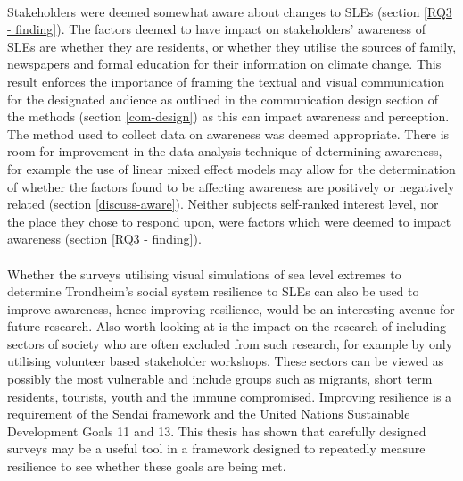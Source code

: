 \paragraph{}
Stakeholders were deemed somewhat aware about changes to SLEs (section \ref{RQ3 - finding}). The factors deemed to have impact on stakeholders' awareness of SLEs are whether they are residents, or whether they utilise the sources of family, newspapers and formal education for their information on climate change. This result enforces the importance of framing the textual and visual communication for the designated audience as outlined in the communication design section of the methods (section \ref{com-design}) as this can impact awareness and perception.  The method used to collect data on awareness was deemed appropriate. There is room for improvement in the data analysis technique of determining awareness, for example the use of linear mixed effect models may allow for the determination of whether the factors found to be affecting awareness are positively or negatively related (section \ref{discuss-aware}). Neither subjects self-ranked interest level, nor the place they chose to respond upon, were factors which were deemed to impact awareness (section \ref{RQ3 - finding}).
\paragraph{}



Whether the surveys utilising visual simulations of sea level extremes to determine Trondheim's social system resilience to SLEs can also be used to improve awareness, hence improving resilience, would be an interesting avenue for future research. Also worth looking at is the impact on the research of including sectors of society who are often excluded from such research, for example by only utilising volunteer based stakeholder workshops. These sectors can be viewed as possibly the most vulnerable and include groups such as migrants, short term residents, tourists, youth and the immune compromised. Improving resilience is a requirement of the Sendai framework and the United Nations Sustainable Development Goals 11 and 13. This thesis has shown that carefully designed surveys may be a useful tool in a framework designed to repeatedly measure resilience to see whether these goals are being met.



